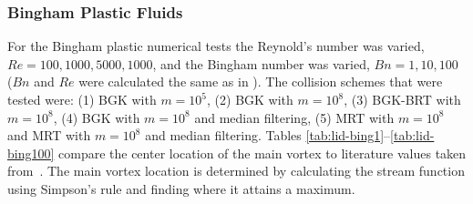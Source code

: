 \documentclass{article}
\begin{document}
\subsubsection{Bingham Plastic Fluids}

For the Bingham plastic numerical tests the Reynold's number was varied, $Re = 100, 1000, 5000, 1000$, and the Bingham number was varied, $Bn = 1, 10, 100$ ($Bn$ and $Re$ were calculated the same as in ).
The collision schemes that were tested were: (1) BGK with $m = 10^5$, (2) BGK with $m = 10^8$, (3) BGK-BRT with $m = 10^8$, (4) BGK with $m = 10^8$ and median filtering, (5) MRT with $m = 10^8$ and MRT with $m = 10^8$ and median filtering.
Tables \ref{tab:lid-bing1}--\ref{tab:lid-bing100} compare the center location of the main vortex to literature values taken from~\citet{syrakos2014performance}.
The main vortex location is determined by calculating the stream function using Simpson's rule and finding where it attains a maximum.
\end{document}
